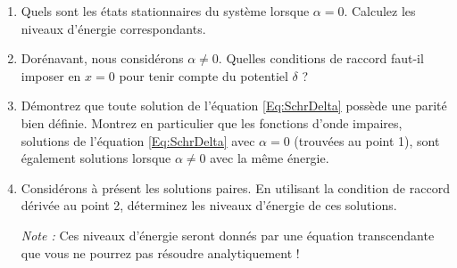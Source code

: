 \begin{enumerate}
\item Quels sont les états stationnaires du système lorsque $\alpha = 0$. Calculez les niveaux d'énergie correspondants.

\item Dorénavant, nous considérons $\alpha \neq  0$. Quelles conditions de raccord faut-il imposer en $x=0$ pour tenir compte du potentiel $\delta$ ?

\item
Démontrez que toute solution de l'équation  \eqref{Eq:SchrDelta} possède une parité bien définie. Montrez en particulier que les fonctions d'onde impaires, solutions de l'équation \eqref{Eq:SchrDelta} avec $\alpha=0$ (trouvées au point 1), sont également solutions lorsque $\alpha\neq 0$ avec la même énergie.

\item Considérons à présent les solutions paires. En utilisant la condition de raccord dérivée au point 2, déterminez les niveaux d'énergie de ces solutions. 

\textit{Note :} Ces niveaux d'énergie seront donnés par une équation transcendante que vous ne pourrez pas résoudre analytiquement !
\end{enumerate}